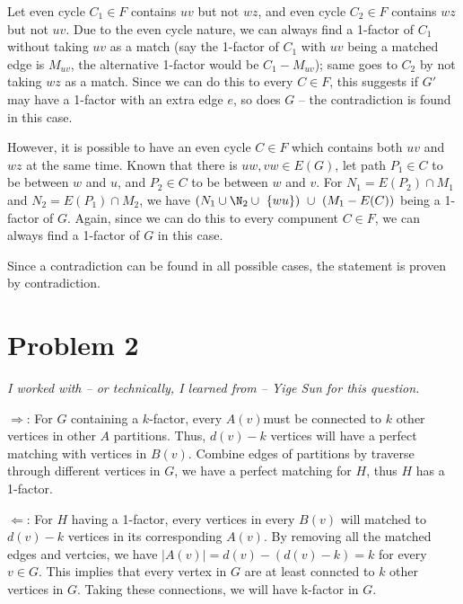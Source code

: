 \documentclass[11pt]{article}
\begin{document}
Let even cycle $C_1 \in F$ contains $uv$ but not $wz$, and even cycle $C_2 \in F$ contains $wz$ but not $uv$. Due to the even cycle nature, we can always find a 1-factor of $C_1$ without taking $uv$ as a match (say the 1-factor of $C_1$ with $uv$ being a matched edge is $M_{uv}$, the alternative 1-factor would be $C_1 - M_{uv}$); same goes to $C_2$ by not taking $wz$ as a match. Since we can do this to every $C \in F$, this suggests if $G'$ may have a 1-factor with an extra edge $e$, so does $G$ -- the contradiction is found in this case.

However, it is possible to have an even cycle $C \in F$ which contains both $uv$ and $wz$ at the same time. Known that there is $uw, vw \in E(G)$, let path $P_1 \in C$ to be between $w$ and $u$, and $P_2 \in C$ to be between $w$ and $v$. For $N_1 = E(P_2) \cap M_1$ and $N_2 = E(P_1) \cap M_2$, we have $(N_1 \cup \N_2 \cup \ \{wu\})  \ \cup \ (M_1 - E(C))$ being a 1-factor of $G$. Again, since we can do this to every compunent $C \in F$, we can always find a 1-factor of $G$ in this case.\newline

Since a contradiction can be found in all possible cases, the statement is proven by contradiction.








\section{Problem 2}

\textit{I worked with -- or technically, I learned from -- Yige Sun for this question.}\newline

$\Longrightarrow$: For $G$ containing a $k$-factor, every $A(v) $must be connected to $k$ other vertices in other $A$ partitions. Thus, $d(v) - k$ vertices will have a perfect matching with vertices in $B(v)$. Combine edges of partitions by traverse through different vertices in $G$, we have a perfect matching for $H$, thus $H$ has a 1-factor.\newline

$\Longleftarrow$: For $H$ having a 1-factor, every vertices in every $B(v)$ will matched to $d(v)-k$ vertices in its corresponding $A(v)$. By removing all the matched edges and vertcies, we have $|A(v)| = d(v) - (d(v) - k) = k$ for every $v \in G$. This implies that every vertex in $G$ are at least conncted to $k$ other vertices in $G$. Taking these connections, we will have k-factor in $G$.


%
% 
% 
\end{document}
